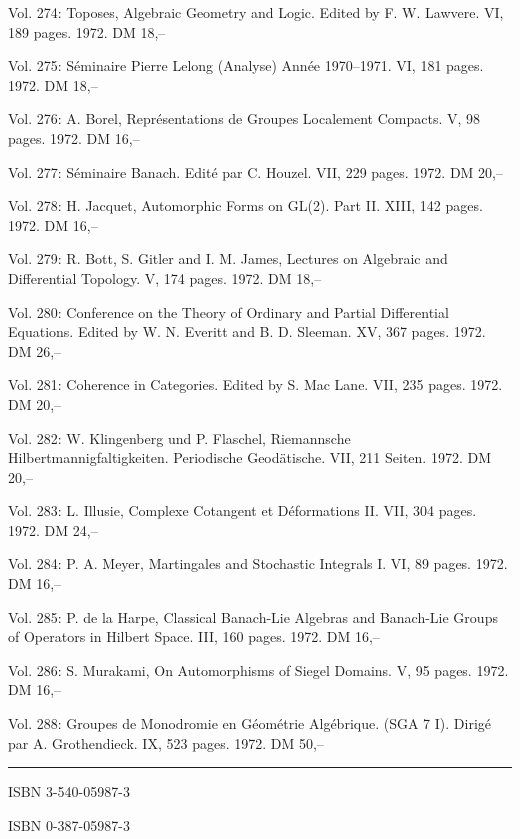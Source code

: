 Vol. 274: Toposes, Algebraic Geometry and Logic. Edited by F. W. Lawvere. VI, 189 pages. 1972. DM 18,--

Vol. 275: Séminaire Pierre Lelong (Analyse) Année 1970--1971. VI, 181 pages. 1972. DM 18,--

Vol. 276: A. Borel, Représentations de Groupes Localement Compacts. V, 98 pages. 1972. DM 16,--

Vol. 277: Séminaire Banach. Edité par C. Houzel. VII, 229 pages. 1972. DM 20,--

Vol. 278: H. Jacquet, Automorphic Forms on GL(2). Part II. XIII, 142 pages. 1972. DM 16,--

Vol. 279: R. Bott, S. Gitler and I. M. James, Lectures on Algebraic and Differential Topology. V, 174 pages. 1972. DM 18,--

Vol. 280: Conference on the Theory of Ordinary and Partial Differential Equations. Edited by W. N. Everitt and B. D. Sleeman. XV, 367 pages. 1972. DM 26,--

Vol. 281: Coherence in Categories. Edited by S. Mac Lane. VII, 235 pages. 1972. DM 20,--

Vol. 282: W. Klingenberg und P. Flaschel, Riemannsche Hilbertmannigfaltigkeiten. Periodische Geodätische. VII, 211 Seiten. 1972. DM 20,--

Vol. 283: L. Illusie, Complexe Cotangent et Déformations II. VII, 304 pages. 1972. DM 24,--

Vol. 284: P. A. Meyer, Martingales and Stochastic Integrals I. VI, 89 pages. 1972. DM 16,--

Vol. 285: P. de la Harpe, Classical Banach-Lie Algebras and Banach-Lie Groups of Operators in Hilbert Space. III, 160 pages. 1972. DM 16,--

Vol. 286: S. Murakami, On Automorphisms of Siegel Domains. V, 95 pages. 1972. DM 16,--

Vol. 288: Groupes de Monodromie en Géométrie Algébrique. (SGA 7 I). Dirigé par A. Grothendieck. IX, 523 pages. 1972. DM 50,--

\noindent\rule{\linewidth}{0.4pt}



ISBN 3-540-05987-3

ISBN 0-387-05987-3
